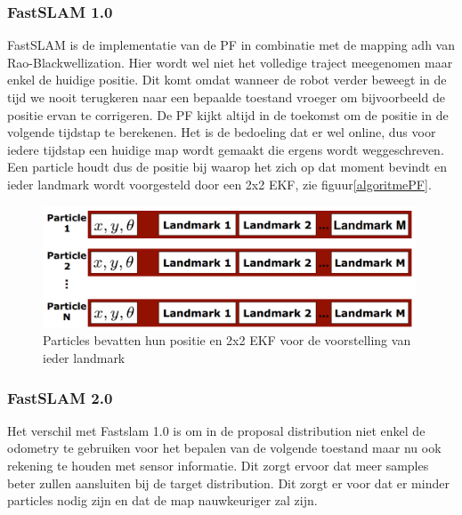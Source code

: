 \documentclass{book}
\begin{document}
\subsubsection{FastSLAM 1.0}
FastSLAM is de implementatie van de PF in combinatie met de mapping adh van Rao-Blackwellization. Hier wordt wel niet het volledige traject meegenomen maar enkel de huidige positie. Dit komt omdat wanneer de robot verder beweegt in de tijd we nooit terugkeren naar een bepaalde toestand vroeger om bijvoorbeeld de positie ervan te corrigeren. De PF kijkt altijd in de toekomst om de positie in de volgende tijdstap te berekenen. Het is de bedoeling dat er wel online, dus voor iedere tijdstap een huidige map wordt gemaakt die ergens wordt weggeschreven. Een particle houdt dus de positie bij waarop het zich op dat moment bevindt en ieder landmark wordt voorgesteld door een 2x2 EKF, zie figuur\ref{algoritmePF}.

\begin{figure}[H]
\centering
\includegraphics[width = 0.99\textwidth]{fastslam.png}
\caption{Particles bevatten hun positie en 2x2 EKF voor de voorstelling van ieder landmark}
\label{fastslam}
\end{figure}

\subsubsection{FastSLAM 2.0}
Het verschil met Fastslam 1.0 is om in de proposal distribution niet enkel de odometry te gebruiken voor het bepalen van de volgende toestand maar nu ook rekening te houden met sensor informatie. Dit zorgt ervoor dat meer samples beter zullen aansluiten bij de target distribution. Dit zorgt er voor dat er minder particles nodig zijn en dat de map nauwkeuriger zal zijn.
\end{document}
